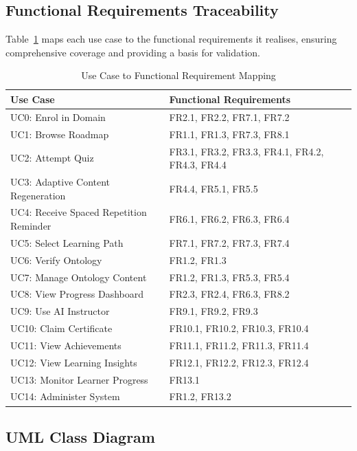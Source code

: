 \subsection{Functional Requirements Traceability}

Table~\ref{tab:ch03_traceability} maps each use case to the functional requirements it realises, ensuring comprehensive coverage and providing a basis for validation.

\begin{table}[htbp]
    \centering
    \caption{Use Case to Functional Requirement Mapping}
    \label{tab:ch03_traceability}
    \small
    \begin{tabular}{@{}p{4.5cm}p{9.5cm}@{}}
        \toprule
        \textbf{Use Case} & \textbf{Functional Requirements} \\
        \midrule
        UC0: Enrol in Domain & FR2.1, FR2.2, FR7.1, FR7.2 \\
        UC1: Browse Roadmap & FR1.1, FR1.3, FR7.3, FR8.1 \\
        UC2: Attempt Quiz & FR3.1, FR3.2, FR3.3, FR4.1, FR4.2, FR4.3, FR4.4 \\
        UC3: Adaptive Content Regeneration & FR4.4, FR5.1, FR5.5 \\
        UC4: Receive Spaced Repetition Reminder & FR6.1, FR6.2, FR6.3, FR6.4 \\
        UC5: Select Learning Path & FR7.1, FR7.2, FR7.3, FR7.4 \\
        UC6: Verify Ontology & FR1.2, FR1.3 \\
        UC7: Manage Ontology Content & FR1.2, FR1.3, FR5.3, FR5.4 \\
        UC8: View Progress Dashboard & FR2.3, FR2.4, FR6.3, FR8.2 \\
        UC9: Use AI Instructor & FR9.1, FR9.2, FR9.3 \\
        UC10: Claim Certificate & FR10.1, FR10.2, FR10.3, FR10.4 \\
        UC11: View Achievements & FR11.1, FR11.2, FR11.3, FR11.4 \\
        UC12: View Learning Insights & FR12.1, FR12.2, FR12.3, FR12.4 \\
        UC13: Monitor Learner Progress & FR13.1 \\
        UC14: Administer System & FR1.2, FR13.2 \\
        \bottomrule
    \end{tabular}
\end{table}

\subsection{UML Class Diagram}

